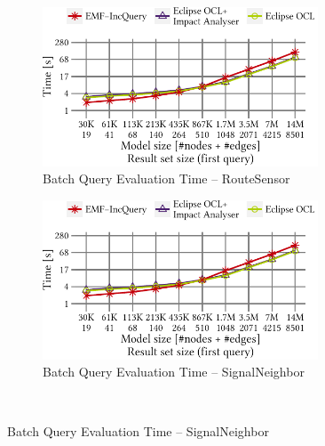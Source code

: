 
\begin{figure}[ht]
\begin{center}
	\begin{subfigure}[t]{0.48\textwidth}\centering
	    \includegraphics[width=0.9\textwidth]{figures/trainBenchmark_User_BatchValid_RouteSensor}
	    \caption{Batch Query Evaluation Time -- RouteSensor}
	    \label{fig:BatchValid_RouteSensor}
	\end{subfigure}
	\begin{subfigure}[t]{0.48\textwidth}\centering
	    \includegraphics[width=0.9\textwidth]{figures/trainBenchmark_User_BatchValid_RouteSensor}
	    \caption{Batch Query Evaluation Time -- SignalNeighbor}
	    \label{fig:BatchValid_SignalNeighbor}
	\end{subfigure} \\


\end{center}
\end{figure}
